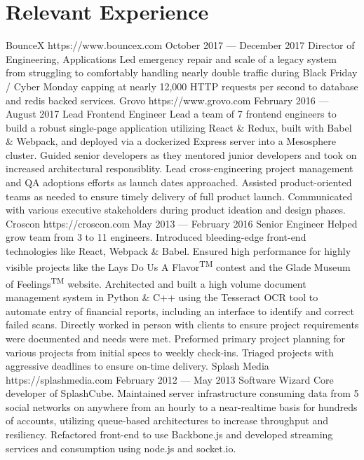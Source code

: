 \documentclass{resume}
\begin{document}
\smallskip

\section{Relevant Experience}

\employer
    {BounceX}
    {https://www.bouncex.com}
    {October 2017 --- December 2017}
    {Director of Engineering, Applications}
    {Led emergency repair and scale of a legacy system from struggling to comfortably handling nearly double traffic during Black Friday / Cyber Monday capping at nearly 12,000 HTTP requests per second to database and redis backed services.}
\employer
    {Grovo}
    {https://www.grovo.com}
    {February 2016 --- August 2017}
    {Lead Frontend Engineer}
    {Lead a team of 7 frontend engineers to build a robust single-page application utilizing React \& Redux, built with Babel \& Webpack, and deployed via a dockerized Express server into a Mesosphere cluster. Guided senior developers as they mentored junior developers and took on increased architectural responsiblity. Lead cross-engineering project management and QA adoptions efforts as launch dates approached. Assisted product-oriented teams as needed to ensure timely delivery of full product launch. Communicated with various executive stakeholders during product ideation and design phases.}
\employer
    {Croscon}
    {https://croscon.com}
    {May 2013 --- February 2016}
    {Senior Engineer}
    {Helped grow team from 3 to 11 engineers. Introduced bleeding-edge front-end technologies like React, Webpack \& Babel. Ensured high performance for highly visible projects like the Lays\textsuperscript{\textregistered} Do Us A Flavor\textsuperscript{TM} contest and the Glade\textsuperscript{\textregistered} Museum of Feelings\textsuperscript{TM} website. Architected and built a high volume document management system in Python \& C++ using the Tesseract OCR tool to automate entry of financial reports, including an interface to identify and correct failed scans. Directly worked in person with clients to ensure project requirements were documented and needs were met. Preformed primary project planning for various projects from initial specs to weekly check-ins. Triaged projects with aggressive deadlines to ensure on-time delivery.}
\employer
    {Splash Media}
    {https://splashmedia.com}
    {February 2012 --- May 2013}
    {Software Wizard}
    {Core developer of SplashCube. Maintained server infrastructure consuming data from 5 social networks on anywhere from an hourly to a near-realtime basis for hundreds of accounts, utilizing queue-based architectures to increase throughput and resiliency. Refactored front-end to use Backbone.js and developed streaming services and consumption using node.js and socket.io.}
\end{document}
